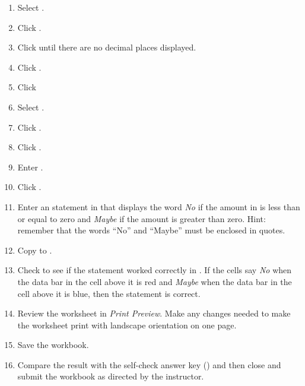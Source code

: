 \begin{enumbox}
\begin{enumerate}
		\item Select .
		\item Click .
		\item Click  until there are no decimal places displayed.
		\item Click .
		\item Click  
	
		\item Select . 
		\item Click .
		
		\item Click . 
		\item Enter . 
		\item Click .
		\item Enter an  statement in that displays the word \textit{No} if the amount in  is less than or equal to zero and \textit{Maybe} if the amount is greater than zero. Hint: remember that the words ``No'' and ``Maybe'' must be enclosed in quotes. 
		\item Copy  to .
	
		\item Check to see if the  statement worked correctly in . If the cells say \textit{No} when the data bar in the cell above it is red and \textit{Maybe} when the data bar in the cell above it is blue, then the  statement is correct.
	
		\item Review the worksheet in \textit{Print Preview}. Make any changes needed to make the worksheet print with landscape orientation on one page.
		\item Save the  workbook.
		\item Compare the result with the self-check answer key () and then close and submit the  workbook as directed by the instructor.
	\end{enumerate}
\end{enumbox}
	
